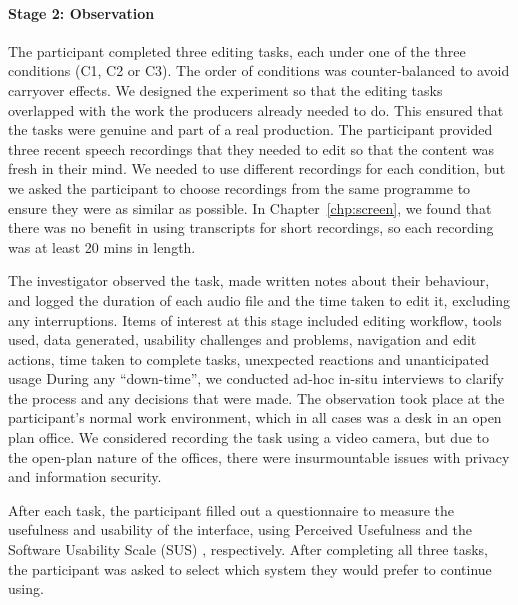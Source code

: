 \paragraph{Stage 2: Observation}

The participant completed three editing tasks, each under one of the three conditions (C1, C2 or C3).  The order of
conditions was counter-balanced to avoid carryover effects.  We designed the experiment so that the editing tasks
overlapped with the work the producers already needed to do. This ensured that the tasks were genuine and part of a
real production.  The participant provided three recent speech recordings that they needed to edit so that the content
was fresh in their mind.  We needed to use different recordings for each condition, but we asked the participant to
choose recordings from the same programme to ensure they were as similar as possible.  In Chapter~\ref{chp:screen}, we
found that there was no benefit in using transcripts for short recordings, so each recording was at least 20 mins in
length. 
 
The investigator observed the task, made written notes about their behaviour, and logged the duration of each audio
file and the time taken to edit it, excluding any interruptions.  Items of interest at this stage included editing
workflow, tools used, data generated, usability challenges and problems, navigation and edit actions, time taken to
complete tasks, unexpected reactions and unanticipated usage During any ``down-time'', we conducted ad-hoc in-situ
interviews to clarify the process and any decisions that were made.  The observation took place at the participant's
normal work environment, which in all cases was a desk in an open plan office.  We considered recording the task using
a video camera, but due to the open-plan nature of the offices, there were insurmountable issues with privacy and
information security.

After each task, the participant filled out a questionnaire to measure the usefulness and usability of the interface,
using Perceived Usefulness \citep{Davis1989} and the Software Usability Scale (SUS) \citep{Brooke1996}, respectively.
After completing all three tasks, the participant was asked to select which system they would prefer to continue using.


